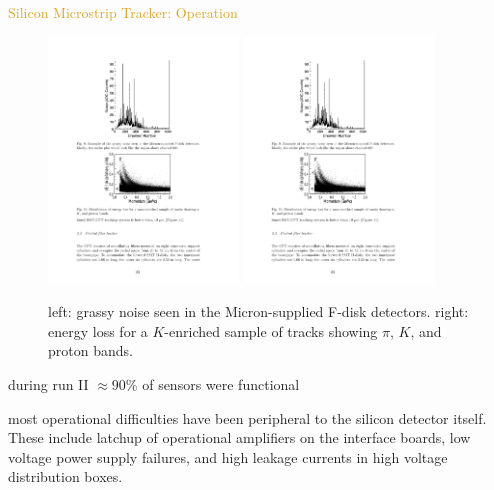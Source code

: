 \begin{frame}{\textcolor{Goldenrod}{Silicon Microstrip Tracker: Operation}}
  \begin{overlayarea}{\textwidth}{\textheight}
    \begin{figure}[h]
      \centering
      \includegraphics[height=0.4\textheight,
      width=0.45\textwidth]{./Images/11_SMT}
      \includegraphics[height=0.4\textheight,
      width=0.45\textwidth]{./Images/12_SMT}
      \caption*{left: grassy noise seen in the Micron-supplied F-disk
        detectors. right: energy loss for a $K$-enriched sample of
        tracks showing $\pi$, $K$, and proton bands.}
      
    \end{figure}
    \itt[<only@+>]  
    
\item during run II $\approx 90$\% of sensors were functional
  
\item most operational difficulties have been peripheral to the
  silicon detector itself. These include latchup of operational
  amplifiers on the interface boards, low voltage power supply
  failures, and high leakage currents in high voltage distribution
  boxes.
  

\end{overlayarea}
\end{frame}
